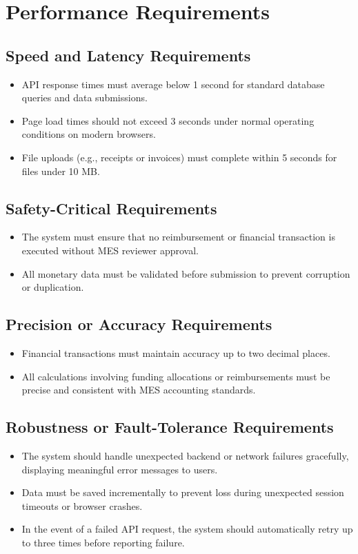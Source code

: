 \documentclass[12pt]{article}
\begin{document}
\section{Performance Requirements}
  \subsection{Speed and Latency Requirements}
    \begin{itemize}
        \item API response times must average below 1 second for standard database queries and data submissions.
        \item Page load times should not exceed 3 seconds under normal operating conditions on modern browsers.
        \item File uploads (e.g., receipts or invoices) must complete within 5 seconds for files under 10 MB.
    \end{itemize}

  \subsection{Safety-Critical Requirements}
    \begin{itemize}
        \item The system must ensure that no reimbursement or financial transaction is executed without MES reviewer approval.
        \item All monetary data must be validated before submission to prevent corruption or duplication.
    \end{itemize}

  \subsection{Precision or Accuracy Requirements}
    \begin{itemize}
        \item Financial transactions must maintain accuracy up to two decimal places.
        \item All calculations involving funding allocations or reimbursements must be precise and consistent with MES accounting standards.
    \end{itemize}

  \subsection{Robustness or Fault-Tolerance Requirements}
    \begin{itemize}
        \item The system should handle unexpected backend or network failures gracefully, displaying meaningful error messages to users.
        \item Data must be saved incrementally to prevent loss during unexpected session timeouts or browser crashes.
        \item In the event of a failed API request, the system should automatically retry up to three times before reporting failure.
    \end{itemize}
\end{document}
